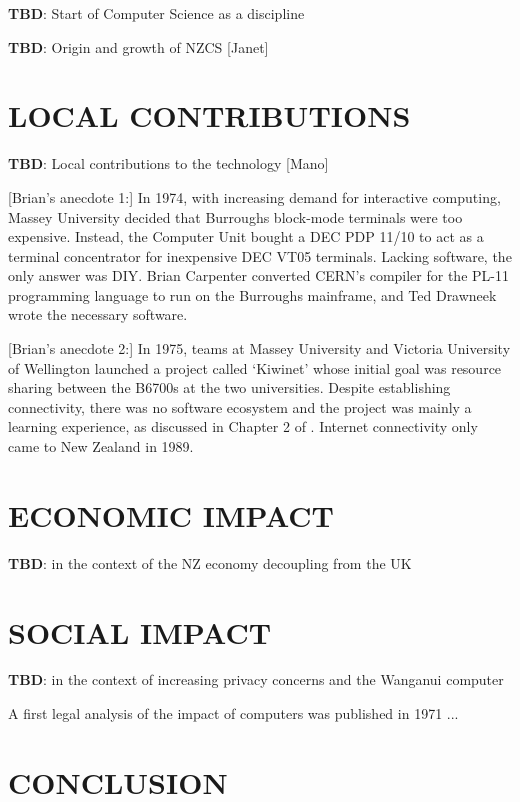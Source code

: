 \documentclass{IEEEcsmag}
\begin{document}
{\bf TBD}: Start of Computer Science as a discipline

{\bf TBD}: Origin and growth of NZCS [Janet]

\vspace*{-8pt}
\section{LOCAL CONTRIBUTIONS}

 {\bf TBD}: Local contributions to the technology [Mano]

[Brian's anecdote 1:] In 1974, with increasing demand for interactive computing, Massey University decided that Burroughs block-mode terminals were too expensive. Instead, the Computer Unit bought a DEC PDP 11/10 to act as a terminal concentrator for inexpensive DEC VT05 terminals. Lacking software, the only answer was DIY. Brian Carpenter converted CERN's compiler for the PL-11 programming language to run on the Burroughs mainframe, and Ted Drawneek wrote the necessary software.

[Brian's anecdote 2:] In 1975, teams at Massey University and Victoria University of Wellington launched a project called `Kiwinet' whose initial goal was resource sharing between the B6700s at the two universities. Despite establishing connectivity, there was no software ecosystem and the project was mainly a learning experience, as discussed in Chapter 2 of \cite{ConnectingClouds}. Internet connectivity only came to New Zealand in 1989.

\vspace*{-8pt}
\section{ECONOMIC IMPACT}

{\bf TBD}: in the context of the NZ economy decoupling from the UK

\vspace*{-8pt}
\section{SOCIAL IMPACT}

{\bf TBD}: in the context of increasing privacy concerns and the Wanganui computer

A first legal analysis of the impact of computers was published in 1971 \cite{Auburn1971}...

\vspace*{-8pt}
\section{CONCLUSION}
\end{document}
